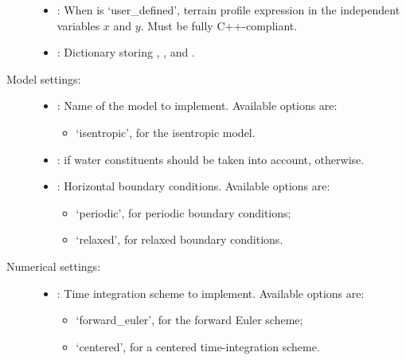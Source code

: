 \documentclass[letterpaper,10pt,english]{sphinxmanual}
\begin{document}
\begin{description}
\begin{itemize}
\item {} 
: When  is ‘user\_defined’, terrain profile expression in the              independent variables \(x\) and \(y\). Must be fully C++-compliant.

\item {} 
: Dictionary storing , ,            and .

\end{itemize}

\item[{Model settings:}] \leavevmode\begin{itemize}
\item {} 
: Name of the model to implement. Available options are:
\begin{itemize}
\item {} 
‘isentropic’, for the isentropic model.

\end{itemize}

\item {} 
:  if water constituents should be taken into account,  otherwise.

\item {} 
: Horizontal boundary conditions. Available options are:
\begin{itemize}
\item {} 
‘periodic’, for periodic boundary conditions;

\item {} 
‘relaxed’, for relaxed boundary conditions.

\end{itemize}

\end{itemize}

\item[{Numerical settings:}] \leavevmode\begin{itemize}
\item {} 
: Time integration scheme to implement. Available options are:
\begin{itemize}
\item {} 
‘forward\_euler’, for the forward Euler scheme;

\item {} 
‘centered’, for a centered time-integration scheme.


\end{itemize}
\end{itemize}
\end{description}
\end{document}

